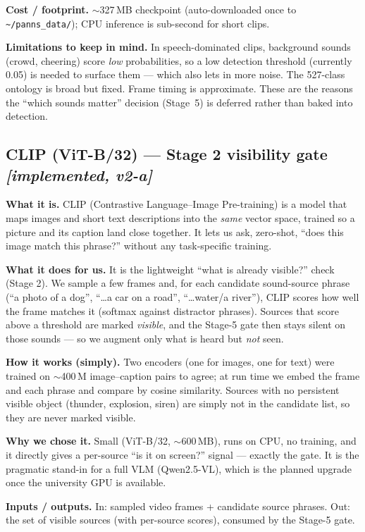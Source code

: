 \documentclass[11pt,a4paper]{article}
\begin{document}
\textbf{Cost / footprint.} $\sim$327\,MB checkpoint (auto-downloaded once to
\texttt{\textasciitilde/panns\_data/}); CPU inference is sub-second for short clips.

\textbf{Limitations to keep in mind.} In speech-dominated clips, background sounds
(crowd, cheering) score \emph{low} probabilities, so a low detection threshold
(currently 0.05) is needed to surface them --- which also lets in more noise. The
527-class ontology is broad but fixed. Frame timing is approximate. These are the
reasons the ``which sounds matter'' decision (Stage~5) is deferred rather than
baked into detection.

\subsection{CLIP (ViT-B/32) --- Stage 2 visibility gate \emph{[implemented, v2-a]}}
\textbf{What it is.} CLIP (Contrastive Language--Image Pre-training) is a model that maps images and
short text descriptions into the \emph{same} vector space, trained so a picture and its caption land
close together. It lets us ask, zero-shot, ``does this image match this phrase?'' without any
task-specific training.

\textbf{What it does for us.} It is the lightweight ``what is already visible?'' check (Stage 2). We
sample a few frames and, for each candidate sound-source phrase (``a photo of a dog'', ``\dots a car
on a road'', ``\dots water/a river''), CLIP scores how well the frame matches it (softmax against
distractor phrases). Sources that score above a threshold are marked \emph{visible}, and the Stage-5
gate then stays silent on those sounds --- so we augment only what is heard but \emph{not} seen.

\textbf{How it works (simply).} Two encoders (one for images, one for text) were trained on
$\sim$400\,M image--caption pairs to agree; at run time we embed the frame and each phrase and compare
by cosine similarity. Sources with no persistent visible object (thunder, explosion, siren) are simply
not in the candidate list, so they are never marked visible.

\textbf{Why we chose it.} Small (ViT-B/32, $\sim$600\,MB), runs on CPU, no training, and it directly
gives a per-source ``is it on screen?'' signal --- exactly the gate. It is the pragmatic stand-in for
a full VLM (Qwen2.5-VL), which is the planned upgrade once the university GPU is available.

\textbf{Inputs / outputs.} In: sampled video frames + candidate source phrases. Out: the set of
visible sources (with per-source scores), consumed by the Stage-5 gate.
\end{document}
